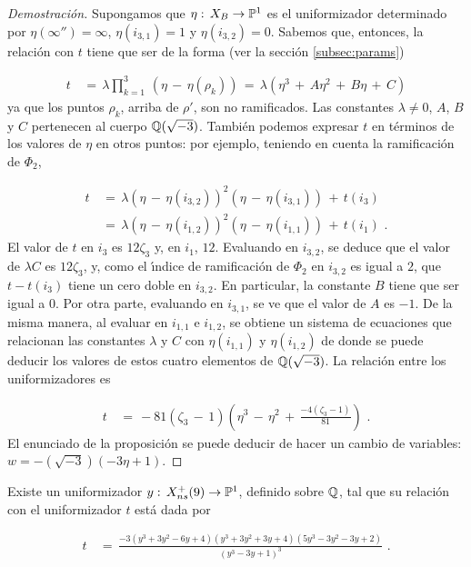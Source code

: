 \begin{proof}[Demostraci\'{o}n]
 Supongamos que $\eta:\,X_{B}\rightarrow\mathbb{P}^{1}$ es el uniformizador determinado
 por $\eta(\infty'')=\infty$, $\eta(i_{3,1})=1$ y $\eta(i_{3,2})=0$. Sabemos que,
 entonces, la relaci\'{o}n con $t$ tiene que ser de la forma
 (ver la secci\'{o}n \ref{subsec:params})

 \begin{align*}
  t &\,=\,\lambda\prod_{k=1}^{3}\,(\eta\,-\,\eta(\rho_{k}))
  \,=\,\lambda(\eta^{3}\,+\,A\eta^{2}\,+\,B\eta\,+\,C)
 \end{align*}
ya que los puntos $\rho_{k}$, arriba de $\rho'$, son no ramificados.
Las constantes $\lambda\not = 0$, $A$, $B$ y $C$ pertenecen al
cuerpo $\mathbb{Q}(\sqrt{-3})$. Tambi\'{e}n podemos expresar $t$ en t\'{e}rminos de
los valores de $\eta$ en otros puntos: por ejemplo, teniendo en cuenta la
ramificaci\'{o}n de $\Phi_{2}$,

\begin{align*}
 t & \,=\,\lambda(\eta\,-\,\eta(i_{3,2}))^{2}(\eta\,-\,\eta(i_{3,1}))
 \,+\,t(i_{3})\\
 & \,=\,\lambda(\eta\,-\,\eta(i_{1,2}))^{2}(\eta\,-\,\eta(i_{1,1}))
 \,+\,t(i_{1})\text{ .}
\end{align*}
El valor de $t$ en $i_{3}$ es $12\zeta_{3}$ y, en $i_{1}$, $12$. Evaluando en
$i_{3,2}$, se deduce que el valor de $\lambda C$ es $12\zeta_{3}$, y, como el
\'{\i}ndice de ramificaci\'{o}n de $\Phi_{2}$ en $i_{3,2}$ es igual a $2$, que
$t-t(i_{3})$ tiene un cero doble en $i_{3,2}$. En particular, la constante $B$
tiene que ser igual a $0$. Por otra parte, evaluando en $i_{3,1}$, se ve que el
valor de $A$ es $-1$. De la misma manera, al evaluar en $i_{1,1}$ e $i_{1,2}$,
se obtiene un sistema de ecuaciones que relacionan las constantes $\lambda$ y $C$
con $\eta(i_{1,1})$ y $\eta(i_{1,2})$ de donde se puede deducir los valores de
estos cuatro elementos de $\mathbb{Q}(\sqrt{-3})$. La relaci\'{o}n entre los
uniformizadores es

\begin{align*}
 t & \,=\,-81(\zeta_{3}\,-\,1)\left(\eta^{3}\,-\,\eta^{2}\,+\,
 \frac{-4(\zeta_{3}-1)}{81}\right)\text{ .}
\end{align*}
El enunciado de la proposici\'{o}n se puede deducir de hacer un cambio de
variables: $w=-(\sqrt{-3})(-3\eta+1)$.
\end{proof}

\begin{propoBaranNineXNine}\label{thm:propoBaranNineXNine}
 Existe un uniformizador $y:\,X_{ns}^{+}(9)\rightarrow\mathbb{P}^{1}$, definido
 sobre $\mathbb{Q}$, tal que su relaci\'{o}n con el uniformizador $t$ est\'{a} dada por

 \begin{align}\label{eq:relUnifsTresYNueve}
  t & \,=\,\frac{-3(y^{3}+3y^{2}-6y+4)(y^{3}+3y^{2}+3y+4)%
  (5y^{3}-3y^{2}-3y+2)}{(y^{3}-3y+1)^{3}}\text{ .}
 \end{align}
\end{propoBaranNineXNine}

